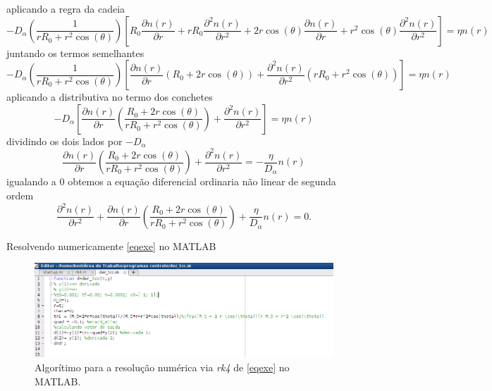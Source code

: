 \documentclass[12pt,oneside,a4paper]{abntex2}
\begin{document}
aplicando a regra da cadeia
\begin{equation*}
-D_\alpha \left( \frac{1}{r R_0 + r^2 \cos(\theta)} \right)  \left[ R_0 \dfrac{\partial n(r)}{\partial r} + r R_0 \dfrac{\partial^2 n(r)}{\partial r^2} + 2 r \cos(\theta)\dfrac{\partial n(r)}{\partial r} + r^2 \cos(\theta)\dfrac{\partial^2 n(r)}{\partial r^2}  \right] =\eta n(r)
\end{equation*}
juntando os termos semelhantes
\begin{equation*}
-D_\alpha \left( \frac{1}{r R_0 + r^2 \cos(\theta)} \right)  \left[ \dfrac{\partial n(r)}{\partial r} (R_0 + 2 r \cos(\theta)) + \dfrac{\partial^2 n(r)}{\partial r^2} (r R_0 + r^2 \cos(\theta)) \right] =\eta n(r)
\end{equation*}
aplicando a distributiva no termo dos conchetes
\begin{equation*}
-D_\alpha \left[ \dfrac{\partial n(r)}{\partial r} \left( \frac{R_0 + 2 r \cos(\theta)}{r R_0 + r^2 \cos(\theta)} \right)+ \dfrac{\partial^2 n(r)}{\partial r^2} \right] =\eta n(r)
\end{equation*}
dividindo os dois lados por $-D_\alpha$
\begin{equation*}
\dfrac{\partial n(r)}{\partial r} \left( \frac{R_0 + 2 r \cos(\theta)}{r R_0 + r^2 \cos(\theta)} \right)+ \dfrac{\partial^2 n(r)}{\partial r^2} =-\frac{\eta}{D_\alpha} n(r)
\end{equation*}
igualando a $0$ obtemos a equação diferencial ordinaria não linear de segunda ordem
\begin{equation}
\label{eqexe}
\dfrac{\partial^2 n(r)}{\partial r^2} + \dfrac{\partial n(r)}{\partial r} \left( \frac{R_0 + 2 r \cos(\theta)}{r R_0 + r^2 \cos(\theta)} \right)+ \frac{\eta}{D_\alpha} n(r) = 0.
\end{equation}

Resolvendo numericamente \ref{eqexe} no MATLAB
\begin{figure}[H]
\centering
\includegraphics[scale=0.4]{exeplo.png} 
\caption{Algorítimo para a resolução numérica via \textit{rk4} de \ref{eqexe} no MATLAB.}
\end{figure}
\end{document}
